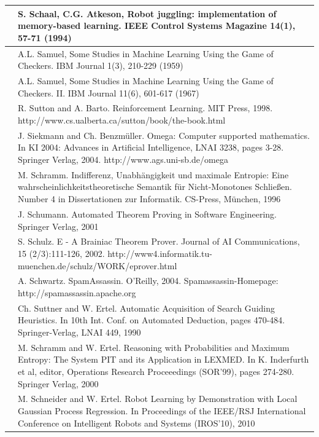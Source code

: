 \documentclass[10pt]{book}
\begin{document}
\begin{tabular}{|l|l|}
\hline [SA94] & S. Schaal, C.G. Atkeson, Robot juggling: implementation of memory-based learning. IEEE Control Systems Magazine 14(1), 57-71 (1994) \\
\hline [Sam59] & A.L. Samuel, Some Studies in Machine Learning Using the Game of Checkers. IBM Journal 1(3), 210-229 (1959) \\
\hline [\cite{samuel1967checkers2}] & A.L. Samuel, Some Studies in Machine Learning Using the Game of Checkers. II. IBM Journal 11(6), 601-617 (1967) \\
\hline [SB98] & R. Sutton and A. Barto. Reinforcement Learning. MIT Press, 1998. http://www.cs.ualberta.ca/sutton/book/the-book.html \\
\hline [SB04] & J. Siekmann and Ch. Benzmüller. Omega: Computer supported mathematics. In KI 2004: Advances in Artificial Intelligence, LNAI 3238, pages 3-28. Springer Verlag, 2004. http://www.ags.uni-sb.de/omega \\
\hline [Sch96] & M. Schramm. Indifferenz, Unabhängigkeit und maximale Entropie: Eine wahrscheinlichkeitstheoretische Semantik für Nicht-Monotones Schließen. Number 4 in Dissertationen zur Informatik. CS-Press, München, 1996 \\
\hline [Sch01] & J. Schumann. Automated Theorem Proving in Software Engineering. Springer Verlag, 2001 \\
\hline [Sch02] & S. Schulz. E - A Brainiac Theorem Prover. Journal of AI Communications, 15 (2/3):111-126, 2002. http://www4.informatik.tu-muenchen.de/schulz/WORK/eprover.html \\
\hline [Sch04] & A. Schwartz. SpamAssassin. O'Reilly, 2004. Spamassassin-Homepage: http://spamassassin.apache.org \\
\hline [SE90] & Ch. Suttner and W. Ertel. Automatic Acquisition of Search Guiding Heuristics. In 10th Int. Conf. on Automated Deduction, pages 470-484. Springer-Verlag, LNAI 449, 1990 \\
\hline [SE00] & M. Schramm and W. Ertel. Reasoning with Probabilities and Maximum Entropy: The System PIT and its Application in LEXMED. In K. Inderfurth et al, editor, Operations Research Proceeedings (SOR'99), pages 274-280. Springer Verlag, 2000 \\
\hline [SE10] & M. Schneider and W. Ertel. Robot Learning by Demonstration with Local Gaussian Process Regression. In Proceedings of the IEEE/RSJ International Conference on Intelligent Robots and Systems (IROS'10), 2010 \\

\end{tabular}
\end{document}
